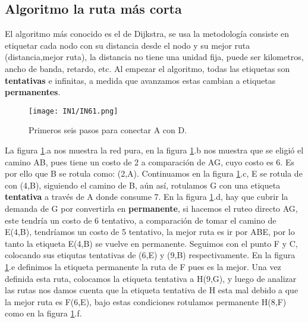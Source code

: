 \documentclass[
	12pt, %
	fleqn, %
	a4paper, %
	oneside, %
]{LegrandOrangeBook}
\begin{document}
\subsection{Algoritmo la ruta más corta}
El algoritmo más conocido es el de Dijkstra, se usa la metodología consiste en etiquetar cada nodo con su distancia desde el nodo y su mejor ruta (distancia,mejor ruta), la distancia no tiene una unidad fija, puede ser kilometros, ancho de banda, retardo, etc. Al empezar el algoritmo, todas las etiquetas son \textbf{tentativas} e infinitas, a medida que avanzamos estas cambian a etiquetas \textbf{permanentes}.
\begin{figure}[H]
\centering
\texttt{[image: IN1/IN61.png]}
\caption{Primeros seis pasos para conectar A con D.}
\label{fig:algo dij}
\end{figure}
La figura \ref{fig:algo dij}.a nos muestra la red pura, en la figura \ref{fig:algo dij}.b nos muestra que se eligió el camino AB, pues tiene un costo de 2 a comparación de AG, cuyo costo es 6. Es por ello que B se rotula como: (2,A). Continuamos en la figura \ref{fig:algo dij}.c, E se rotula de con (4,B), siguiendo el camino de B, aún así, rotulamos G con una etiqueta \textbf{tentativa} a través de A donde consume 7. En la figura \ref{fig:algo dij}.d, hay que cubrir la demanda de G por convertirla en \textbf{permanente}, si hacemos el ruteo directo AG, este tendría un costo de 6 tentativo, a comparación de tomar el camino de E(4,B), tendríamos un costo de 5 tentativo, la mejor ruta es ir por ABE, por lo tanto la etiqueta E(4,B) se vuelve en permanente. Seguimos con el punto F y C, colocando sus etiqutas tentativas de (6,E) y (9,B) respectivamente. En la figura \ref{fig:algo dij}.e definimos la etiqueta permanente la ruta de F pues es la mejor. Una vez definida esta ruta, colocamos la etiqueta tentativa a H(9,G), y luego de analizar las rutas nos damos cuenta que la etiqueta tentativa de H esta mal debido a que la mejor ruta es F(6,E), bajo estas condiciones rotulamos permanente H(8,F) como en la figura \ref{fig:algo dij}.f.
\end{document}
